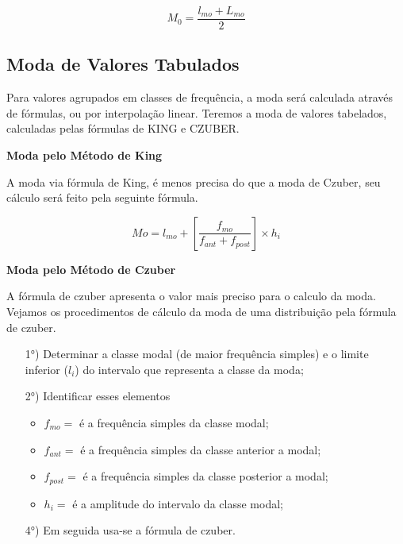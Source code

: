 \begin{equation}\label{}
    M_{0}= \frac{l_{mo}+L_{mo}}{2}
\end{equation}


\subsection{Moda de Valores Tabulados}

\vskip0.3cm

Para valores agrupados em classes de frequência, a moda será calculada através de fórmulas, ou por interpolação linear. Teremos a moda de valores tabelados, calculadas pelas fórmulas de KING e CZUBER.
\vskip0.3cm


\textbf{Moda pelo Método de King}
\vskip0.3cm

A moda via fórmula de King, é menos precisa do que a moda de Czuber, seu cálculo será feito pela seguinte fórmula.


\begin{equation}\label{}
    Mo=l_{mo}+\left[\frac{f_{mo}}{f_{ant}+f_{post}}\right]\times h_{i}
\end{equation}


\textbf{Moda pelo Método de Czuber}
\vskip0.3cm

A fórmula de czuber apresenta o valor mais preciso para o calculo da moda. Vejamos os procedimentos
de cálculo da moda de uma distribuição pela fórmula de czuber.


\begin{enumerate}
\item [{1°)}] Determinar a classe modal (de maior frequência simples) e o limite inferior ($l_{i}$) do intervalo que representa a classe da moda;
\item [{2°)}] Identificar esses elementos
\begin{itemize}
   \item $f_{mo}=$ é a frequência simples da classe modal;
   \item $f_{ant}=$ é a frequência simples da classe anterior a modal;
   \item $f_{post}=$ é a frequência simples da classe posterior a modal;
   \item $h_{i}=$ é a amplitude do intervalo da classe modal;
 \end{itemize}
\item [{4°)}] Em seguida usa-se a fórmula de czuber.
\end{enumerate}

